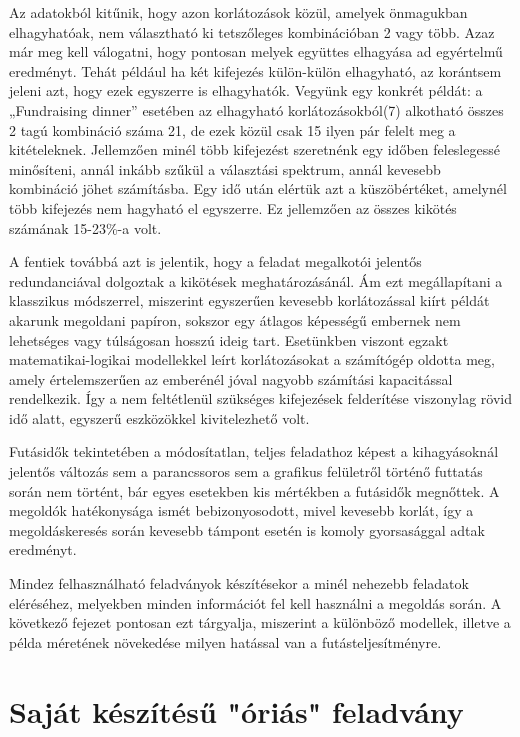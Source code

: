 \documentclass[12pt,a4paper]{report}
\begin{document}
    Az adatokból kitűnik, hogy azon korlátozások közül, amelyek önmagukban elhagyhatóak, nem választható ki tetszőleges kombinációban 2 vagy több.
    Azaz már meg kell válogatni, hogy pontosan melyek együttes elhagyása ad egyértelmű eredményt.
    Tehát például ha két kifejezés külön-külön elhagyható, az korántsem jeleni azt, hogy ezek egyszerre is elhagyhatók.
    Vegyünk egy konkrét példát: a „Fundraising dinner” esetében az elhagyható korlátozásokból(7) alkotható összes 2 tagú kombináció száma 21, de ezek közül csak 15 ilyen pár felelt meg a kitételeknek.
    Jellemzően minél több kifejezést szeretnénk egy időben feleslegessé minősíteni, annál inkább szűkül a választási spektrum, annál kevesebb kombináció jöhet számításba.
    Egy idő után elértük azt a küszöbértéket, amelynél több kifejezés nem hagyható el egyszerre.
    Ez jellemzően az összes kikötés számának 15-23\%-a volt.
    
    A fentiek továbbá azt is jelentik, hogy a feladat megalkotói jelentős redundanciával dolgoztak a kikötések meghatározásánál.
    Ám ezt megállapítani a klasszikus módszerrel, miszerint egyszerűen kevesebb korlátozással kiírt példát akarunk megoldani papíron, sokszor egy átlagos képességű embernek nem lehetséges vagy túlságosan hosszú ideig tart.
    Esetünkben viszont egzakt matematikai-logikai modellekkel leírt korlátozásokat a számítógép oldotta meg, amely értelemszerűen az emberénél jóval nagyobb számítási kapacitással rendelkezik.
    Így a nem feltétlenül szükséges kifejezések felderítése viszonylag rövid idő alatt, egyszerű eszközökkel kivitelezhető volt.
    
    Futásidők tekintetében a módosítatlan, teljes feladathoz képest a kihagyásoknál jelentős változás sem a parancssoros sem a grafikus felületről történő futtatás során nem történt, bár egyes esetekben kis mértékben a futásidők megnőttek.
    A megoldók hatékonysága ismét bebizonyosodott, mivel kevesebb korlát, így a megoldáskeresés során kevesebb támpont esetén is komoly gyorsasággal adtak eredményt.
    
    Mindez felhasználható feladványok készítésekor a minél nehezebb feladatok eléréséhez, melyekben minden információt fel kell használni a megoldás során. A következő fejezet pontosan ezt tárgyalja, miszerint a különböző modellek, illetve a példa méretének növekedése milyen hatással van a futásteljesítményre.
    
    \chapter{Saját készítésű "óriás" feladvány}
    
\end{document}
